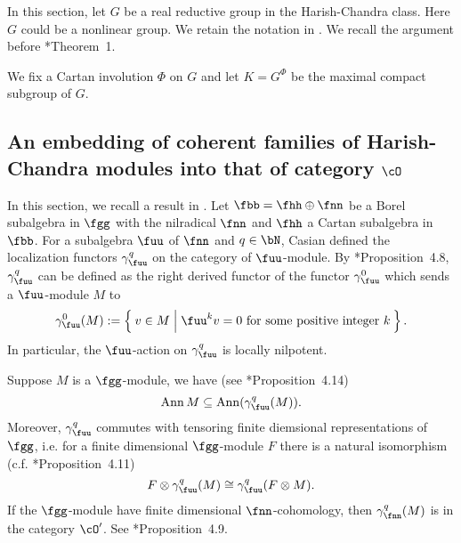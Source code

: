 \documentclass[12pt,a4paper]{amsart}
\DeclareMathOperator{\Ann}{Ann}
\numberwithin{equation}{section}
\newtheorem{thm}{Theorem}[section]
\theoremstyle{remark}
\def\Spr{\mathrm{Springer}}
\begin{document}
In this section, let $G$ be a real reductive group in the Harish-Chandra class.
Here $G$ could be a nonlinear group.
We retain the notation in .
We recall the argument before \cite{Mc}*{Theorem~1}.

We fix a Cartan involution $\Phi$ on $G$ and let $K = G^{\Phi}$
be the maximal compact subgroup of $G$.



\subsection{An embedding of coherent families of Harish-Chandra modules into
  that of category $\cO$}
In this section, we recall a result in \cite{Cas}. Let $\fbb = \fhh\oplus \fnn$
be a Borel subalgebra in $\fgg$ with the nilradical $\fnn$ and $\fhh$ a Cartan
subalgebra in $\fbb$. For a subalgebra $\fuu$ of $\fnn$ and $q\in \bN$, Casian
defined the localization functors $\gamma_{\fuu}^{q}$ on the category of
$\fuu$-module. By \cite{Cas}*{Proposition~4.8}, $\gamma_{\fuu}^{q}$ can be
defined as the right derived functor of the functor $\gamma_{\fuu}^{0}$ which
sends a $\fuu$-module $M$ to
\[
  \gamma_{\fuu}^{0}(M):= \Set{v\in M| \fuu^{k} v = 0 \text{ for some positive
      integer $k$}}.
\]
In particular, the $\fuu$-action on $\gamma_{\fuu}^{q}$ is locally nilpotent.

Suppose $M$ is a $\fgg$-module, we have (see \cite{Cas}*{Proposition~4.14})
\begin{equation}\label{eq:anngamma}
  \Ann M \subseteq \Ann (\gamma_{\fuu}^{q}(M)).
\end{equation}
Moreover, $\gamma_{\fuu}^{q}$ commutes with tensoring finite diemsional
representations of $\fgg$, i.e. for a finite dimensional $\fgg$-module $F$ there
is a natural isomorphism (c.f. \cite{Cas}*{Proposition~4.11})
\begin{equation}\label{eq:Fgamma}
  F\otimes \gamma_{\fuu}^{q}(M)\cong
  \gamma_{\fuu}^{q}(F\otimes M).
\end{equation}
If the $\fgg$-module have finite dimensional $\fnn$-cohomology, then
$\gamma_{\fnn}^{q}(M)$ is in the category $\cO'$. See
\cite{Cas}*{Proposition~4.9}.
\end{document}
